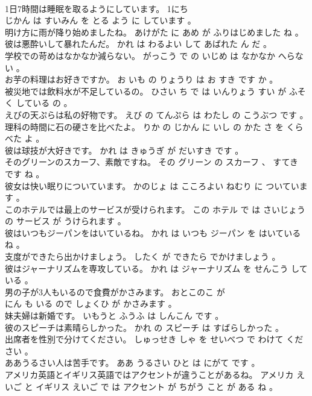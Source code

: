 \documentclass[8pt]{extreport}
\begin{document}
\begin{CJK}{UTF8}{min}
\\	1日7時間は睡眠を取るようにしています。	1にち 
\\	じかん は すいみん を とる よう に しています 。 
\\	明け方に雨が降り始めましたね。	あけがた に あめ が ふりはじめました ね 。 
\\	彼は悪酔いして暴れたんだ。	かれ は わるよい して あばれた ん だ 。 
\\	学校での苛めはなかなか減らない。	がっこう で の いじめ は なかなか へらない 。 
\\	お芋の料理はお好きですか。	お いも の りょうり は お すき です か 。 
\\	被災地では飲料水が不足しているの。	ひさい ち で は いんりょう すい が ふそく している の 。 
\\	えびの天ぷらは私の好物です。	えび の てんぷら は わたし の こうぶつ です 。 
\\	理科の時間に石の硬さを比べたよ。	りか の じかん に いし の かた さ を くらべた よ 。 
\\	彼は球技が大好きです。	かれ は きゅうぎ が だいすき です 。 
\\	そのグリーンのスカーフ、素敵ですね。	その グリーン の スカーフ 、 すてき です ね 。 
\\	彼女は快い眠りについています。	かのじょ は こころよい ねむり に ついています 。 
\\	このホテルでは最上のサービスが受けられます。	この ホテル で は さいじょう の サービス が うけられます 。 
\\	彼はいつもジーパンをはいているね。	かれ は いつも ジーパン を はいている ね 。 
\\	支度ができたら出かけましょう。	したく が できたら でかけましょう 。 
\\	彼はジャーナリズムを専攻している。	かれ は ジャーナリズム を せんこう している 。 
\\	男の子が3人もいるので食費がかさみます。	おとこのこ が 
\\	にん も いる ので しょくひ が かさみます 。 
\\	妹夫婦は新婚です。	いもうと ふうふ は しんこん です 。 
\\	彼のスピーチは素晴らしかった。	かれ の スピーチ は すばらしかった 。 
\\	出席者を性別で分けてください。	しゅっせき しゃ を せいべつ で わけて ください 。 
\\	ああうるさい人は苦手です。	ああ うるさい ひと は にがて です 。 
\\	アメリカ英語とイギリス英語ではアクセントが違うことがあるね。	アメリカ えいご と イギリス えいご で は アクセント が ちがう こと が ある ね 。 

\end{CJK}
\end{document}
